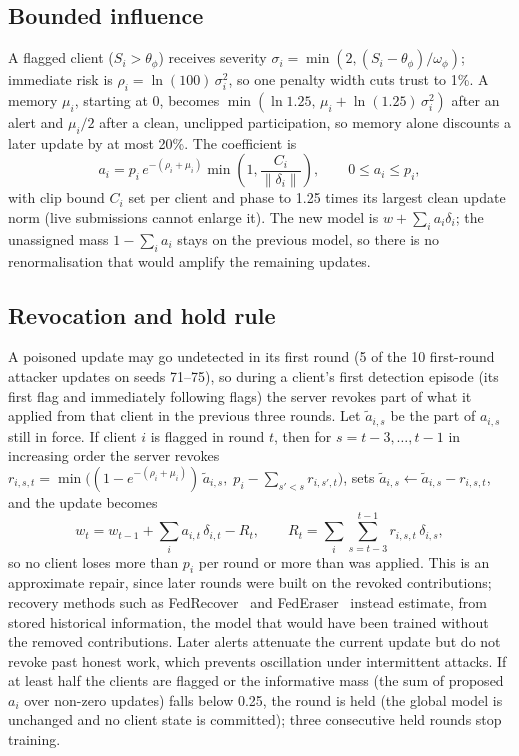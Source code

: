 \documentclass[conference]{IEEEtran}
\begin{document}
\subsection{Bounded influence}
A flagged client ($S_i > \theta_\phi$) receives severity $\sigma_i = \min(2, (S_i - \theta_\phi)/\omega_\phi)$; immediate risk is $\rho_i = \ln(100)\,\sigma_i^2$, so one penalty width cuts trust to 1\%. A memory $\mu_i$, starting at 0, becomes $\min(\ln 1.25,\, \mu_i + \ln(1.25)\,\sigma_i^2)$ after an alert and $\mu_i/2$ after a clean, unclipped participation, so memory alone discounts a later update by at most 20\%. The coefficient is
\begin{equation}
a_i = p_i\, e^{-(\rho_i + \mu_i)} \min\!\left(1, \frac{C_i}{\lVert \delta_i \rVert}\right), \qquad 0 \le a_i \le p_i,
\end{equation}
with clip bound $C_i$ set per client and phase to 1.25 times its largest clean update norm (live submissions cannot enlarge it). The new model is $w + \sum_i a_i \delta_i$; the unassigned mass $1 - \sum_i a_i$ stays on the previous model, so there is no renormalisation that would amplify the remaining updates.

\subsection{Revocation and hold rule}
A poisoned update may go undetected in its first round (5 of the 10 first-round attacker updates on seeds 71--75), so during a client's first detection episode (its first flag and immediately following flags) the server revokes part of what it applied from that client in the previous three rounds. Let $\tilde a_{i,s}$ be the part of $a_{i,s}$ still in force. If client $i$ is flagged in round $t$, then for $s = t-3, \dots, t-1$ in increasing order the server revokes $r_{i,s,t} = \min\big((1-e^{-(\rho_i+\mu_i)})\,\tilde a_{i,s},\; p_i - \sum_{s'<s} r_{i,s',t}\big)$, sets $\tilde a_{i,s} \leftarrow \tilde a_{i,s} - r_{i,s,t}$, and the update becomes
\begin{equation}
w_t = w_{t-1} + \textstyle\sum_i a_{i,t}\,\delta_{i,t} - R_t, \qquad R_t = \sum_i \sum_{s=t-3}^{t-1} r_{i,s,t}\,\delta_{i,s},
\end{equation}
so no client loses more than $p_i$ per round or more than was applied. This is an approximate repair, since later rounds were built on the revoked contributions; recovery methods such as FedRecover~\cite{cao2023fedrecover} and FedEraser~\cite{liu2021federaser} instead estimate, from stored historical information, the model that would have been trained without the removed contributions. Later alerts attenuate the current update but do not revoke past honest work, which prevents oscillation under intermittent attacks. If at least half the clients are flagged or the informative mass (the sum of proposed $a_i$ over non-zero updates) falls below 0.25, the round is held (the global model is unchanged and no client state is committed); three consecutive held rounds stop training.
\end{document}
